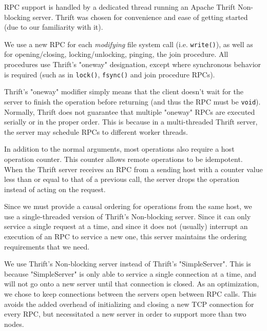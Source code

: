 RPC support is handled by a dedicated thread running an Apache Thrift Non-blocking
server. Thrift was chosen for convenience and ease of getting started (due to
our familiarity with it).

We use a new RPC for each \textit{modifying} file system call (i.e.
\texttt{write()}), as well as for opening/closing, locking/unlocking, pinging,
the join procedure. All procedures use Thrift's "oneway" designation, except
where synchronous behavior is required (such as in \texttt{lock()},
\texttt{fsync()} and join procedure RPCs).

Thrift's "oneway" modifier simply means that the client doesn't wait for the
server to finish the operation before returning (and thus the RPC must be
\texttt{void}). Normally, Thrift does not guarantee that multiple "oneway" RPCs
are executed serially or in the proper order. This is because in a
multi-threaded Thrift server, the server may schedule RPCs to different worker
threads.

In addition to the normal arguments, most operations also require a host
operation counter. This counter allows remote operations to be idempotent. When
the Thrift server receives an RPC from a sending host with a counter value less
than or equal to that of a previous call, the server drops the operation instead
of acting on the request.

Since we must provide a causal ordering for operations from the same host, we
use a single-threaded version of Thrift's Non-blocking server. Since it can only
service a single request at a time, and since it does not (usually) interrupt an
execution of an RPC to service a new one, this server maintains the ordering
requirements that we need.

We use Thrift's Non-blocking server instead of Thrift's "SimpleServer". This is
because "SimpleServer" is only able to service a single connection at a time,
and will not go onto a new server until that connection is closed. As an
optimization, we chose to keep connections between the servers open between RPC
calls. This avoids the added overhead of initializing and closing a new TCP
connection for every RPC, but necessitated a new server in order to support
more than two nodes.

